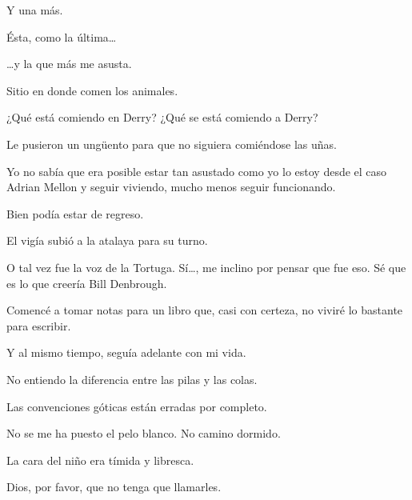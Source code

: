 \sk
Y una más. 

\sk
Ésta, como la última\ldots{} 

\sk
\ldots{}y la que más me asusta. 

\sk
Sitio en donde comen los animales. 

\sk
¿Qué está comiendo en Derry? ¿Qué se está
comiendo a Derry?

\sk
Le pusieron un ungüento para que no siguiera comiéndose las uñas. 

\sk
Yo no sabía que era
posible estar tan asustado como yo lo estoy desde
el caso Adrian Mellon y seguir viviendo, mucho
menos seguir funcionando.

\sk
Bien podía estar de regreso. 

\sk
El vigía subió a la atalaya para su turno. 

\sk
O tal vez fue la voz de la Tortuga. Sí\ldots{}, me
inclino por pensar que fue eso. Sé que es lo que
creería Bill Denbrough.

\sk
Comencé a tomar notas
para un libro que, casi con certeza, no viviré lo
bastante para escribir.\nb{}

\sk
Y al mismo tiempo, seguía
adelante con mi vida. 

\sk
No entiendo la diferencia entre las pilas y las colas. 

\sk
Las convenciones góticas están erradas por
completo. 

\sk
No se me ha puesto el pelo blanco. No
camino dormido. 

\sk
La cara del niño era tímida y libresca. 

\sk
Dios, por favor, que no tenga que llamarles.


